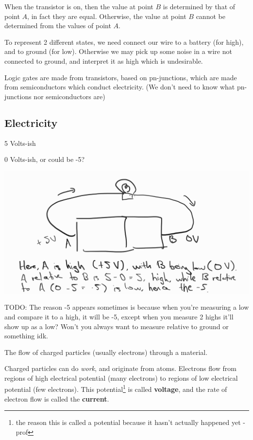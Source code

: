 When the transistor is on, then the value at point $B$ is determined by that of point $A$, in fact they are equal. Otherwise, the value at point $B$ cannot be determined from the values of point $A$.

To represent 2 different states, we need connect our wire to a battery (for high), and to ground (for low). Otherwise we may pick up some noise in a wire not connected to ground, and interpret it as high which is undesirable.

\begin{remark}
    Logic gates are made from transistors, based on pn-junctions, which are made from semiconductors which conduct electricity. (We don't need to know what pn-junctions nor semiconductors are)
\end{remark}

\subsection{Electricity}
\begin{definition}
    5 Volts-ish
\end{definition}
\begin{definition}
    0 Volts-ish, or could be -5?
\end{definition}

\includegraphics{csc258/figures/neg5explanation.jpg}

TODO: The reason -5 appears sometimes is because when you're measuring a low and compare it to a high, it will be -5, except when you measure 2 highs it'll show up as a low? Won't you always want to measure relative to ground or something idk.

\begin{definition}[Electricity]
    The flow of charged particles (usually electrons) through a material. 
\end{definition}
Charged particles can do \textit{work}, and originate from atoms. Electrons flow from regions of high electrical potential (many electrons) to regions of low electrical potential (few electrons). This potential\footnote{the reason this is called a potential because it hasn't actually happened yet - prof} is called \textbf{voltage}, and the rate of electron flow is called the \textbf{current}.

